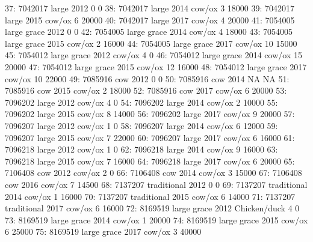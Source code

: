 \begin{Schunk}
\begin{Soutput}
37: 7042017       large 2012                          0          0
38: 7042017       large 2014        cow/ox            3      18000
39: 7042017       large 2015        cow/ox            6      20000
40: 7042017       large 2017        cow/ox            4      20000
41: 7054005 large grace 2012                          0          0
42: 7054005 large grace 2014        cow/ox            4      18000
43: 7054005 large grace 2015        cow/ox            2      16000
44: 7054005 large grace 2017        cow/ox           10      15000
45: 7054012 large grace 2012        cow/ox            4          0
46: 7054012 large grace 2014        cow/ox           15      20000
47: 7054012 large grace 2015        cow/ox           12      16000
48: 7054012 large grace 2017        cow/ox           10      22000
49: 7085916         cow 2012                          0          0
50: 7085916         cow 2014                         NA         NA
51: 7085916         cow 2015        cow/ox            2      18000
52: 7085916         cow 2017        cow/ox            6      20000
53: 7096202       large 2012        cow/ox            4          0
54: 7096202       large 2014        cow/ox            2      10000
55: 7096202       large 2015        cow/ox            8      14000
56: 7096202       large 2017        cow/ox            9      20000
57: 7096207       large 2012        cow/ox            1          0
58: 7096207       large 2014        cow/ox            6      12000
59: 7096207       large 2015        cow/ox            7      22000
60: 7096207       large 2017        cow/ox            6      16000
61: 7096218       large 2012        cow/ox            1          0
62: 7096218       large 2014        cow/ox            9      16000
63: 7096218       large 2015        cow/ox            7      16000
64: 7096218       large 2017        cow/ox            6      20000
65: 7106408         cow 2012        cow/ox            2          0
66: 7106408         cow 2014        cow/ox            3      15000
67: 7106408         cow 2016        cow/ox            7      14500
68: 7137207 traditional 2012                          0          0
69: 7137207 traditional 2014        cow/ox            1      16000
70: 7137207 traditional 2015        cow/ox            6      14000
71: 7137207 traditional 2017        cow/ox            6      16000
72: 8169519 large grace 2012  Chicken/duck            4          0
73: 8169519 large grace 2014        cow/ox            1      20000
74: 8169519 large grace 2015        cow/ox            6      25000
75: 8169519 large grace 2017        cow/ox            3      40000

\end{Soutput}
\end{Schunk}
